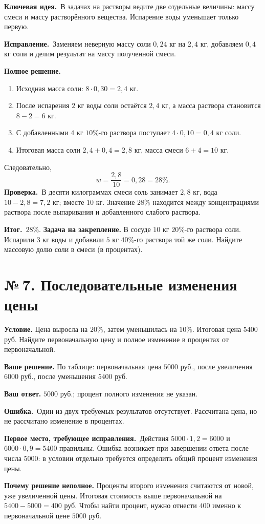 \documentclass[a4paper,12pt]{article}
\newcommand{\errlabel}{\textcolor{err}{\textbf{Ошибка.}}}
\newcommand{\keylabel}{\textcolor{accent}{\textbf{Ключевая идея.}}}
\newcommand{\resultlabel}{\textcolor{accent}{\textbf{Итог.}}}
\newcommand{\reviewtask}[2]{\clearpage\phantomsection\label{task:#1}\section*{\textcolor{accent}{№\,#1. #2}}}
\newcommand{\firstwrong}{\textbf{Первое место, требующее исправления.}}
\newcommand{\fix}{\textbf{Исправление.}}
\newcommand{\verify}{\textbf{Проверка.}}
\newcommand{\practice}{\medskip\textbf{Задача на закрепление.} }
\begin{document}
\keylabel\ В задачах на растворы ведите две отдельные величины: массу смеси и массу растворённого вещества. Испарение воды уменьшает только первую.

\fix\ Заменяем неверную массу соли $0{,}24$ кг на $2{,}4$ кг, добавляем $0{,}4$ кг соли и делим результат на массу полученной смеси.

\textbf{Полное решение.}
\begin{enumerate}
\item Исходная масса соли: $8\cdot0{,}30=2{,}4$ кг.
\item После испарения $2$ кг воды соли остаётся $2{,}4$ кг, а масса раствора становится $8-2=6$ кг.
\item С добавленными $4$ кг $10\%$-го раствора поступает $4\cdot0{,}10=0{,}4$ кг соли.
\item Итоговая масса соли $2{,}4+0{,}4=2{,}8$ кг, масса смеси $6+4=10$ кг.
\end{enumerate}
Следовательно,
\[
w=\frac{2{,}8}{10}=0{,}28=28\%.
\]
\verify\ В десяти килограммах смеси соль занимает $2{,}8$ кг, вода $10-2{,}8=7{,}2$ кг; вместе $10$ кг. Значение $28\%$ находится между концентрациями раствора после выпаривания и добавленного слабого раствора.

\resultlabel\ $\boxed{28\%}$.
\practice В сосуде $10$ кг $20\%$-го раствора соли. Испарили $3$ кг воды и добавили $5$ кг $40\%$-го раствора той же соли. Найдите массовую долю соли в смеси (в процентах).

\reviewtask{7}{Последовательные изменения цены}
\textbf{Условие.} Цена выросла на $20\%$, затем уменьшилась на $10\%$. Итоговая цена $5400$ руб. Найдите первоначальную цену и полное изменение в процентах от первоначальной.

\textbf{Ваше решение.} По таблице: первоначальная цена $5000$ руб., после увеличения $6000$ руб., после уменьшения $5400$ руб.

\textbf{Ваш ответ.} $5000$ руб.; процент полного изменения не указан.

\errlabel\ Один из двух требуемых результатов отсутствует. Рассчитана цена, но не рассчитано изменение в процентах.

\firstwrong\ Действия $5000\cdot1{,}2=6000$ и $6000\cdot0{,}9=5400$ правильны. Ошибка возникает при завершении ответа после числа $5000$: в условии отдельно требуется определить общий процент изменения цены.

\textbf{Почему решение неполное.} Проценты второго изменения считаются от новой, уже увеличенной цены. Итоговая стоимость выше первоначальной на $5400-5000=400$ руб. Чтобы найти процент, нужно отнести $400$ именно к первоначальной цене $5000$ руб.
\end{document}
